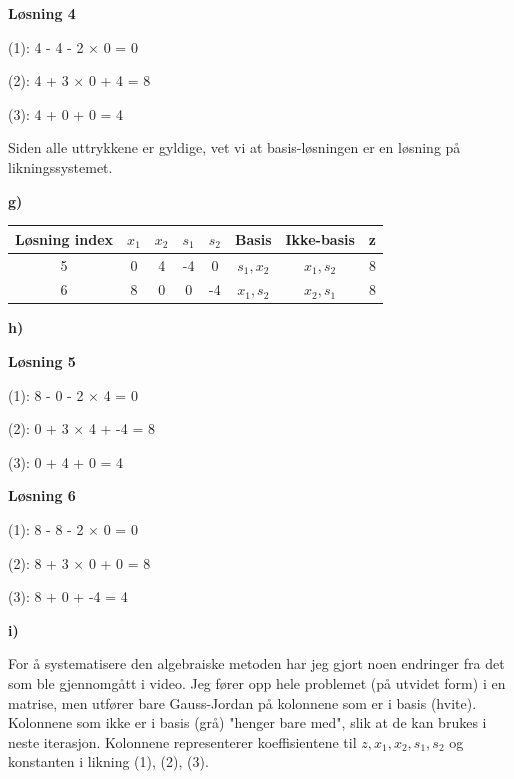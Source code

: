 \documentclass{article}
\begin{document}
    \vspace*{12pt}\textbf{Løsning 4}
    
    (1): 4 - 4 - 2 $\times$ 0 = 0
    
    (2): 4 + 3 $\times$ 0 + 4 = 8
    
    (3): 4 + 0 + 0 = 4
    
    \vspace*{12pt}
    Siden alle uttrykkene er gyldige, vet vi at basis-løsningen er en løsning på likningssystemet.
    
    \vspace*{12pt}\small\textbf{g)}
    
    
    \begin{table}[h!]
        \centering
        \begin{tabular}{|c|c|c|c|c|c|c|c|}
            \hline
            Løsning index & $x_1$ & $x_2 $ & $s_1$ & $s_2$ & Basis & Ikke-basis & z \\\hline
            5 & 0 & 4 & -4 & 0 & $s_1, x_2$ & $x_1, s_2$ & 8 \\\hline
            6 & 8 & 0 & 0 & -4 & $x_1, s_2$ & $x_2, s_1$ & 8 \\\hline
        \end{tabular}
    \end{table}
    
    \vspace*{12pt}\small\textbf{h)}
    
    \vspace*{12pt}\textbf{Løsning 5}
    
    (1): 8 - 0 - 2 $\times$ 4 = 0
    
    (2): 0 + 3 $\times$ 4 + -4 = 8
    
    (3): 0 + 4 + 0 = 4
    
    \vspace*{12pt}\textbf{Løsning 6}
    
    (1): 8 - 8 - 2 $\times$ 0 = 0
    
    (2): 8 + 3 $\times$ 0 + 0 = 8
    
    (3): 8 + 0 + -4 = 4
    
    \vspace*{12pt}\small\textbf{i)}
    
    For å systematisere den algebraiske metoden har jeg gjort noen endringer fra det som ble gjennomgått i video. Jeg fører opp hele problemet (på utvidet form) i en matrise, men utfører bare Gauss-Jordan på kolonnene som er i basis (hvite).
    Kolonnene som ikke er i basis (grå) "henger bare med", slik at de kan brukes i neste iterasjon. Kolonnene representerer koeffisientene til $z, x_1, x_2, s_1, s_2$ og konstanten i likning (1), (2), (3). 
    
\end{document}
